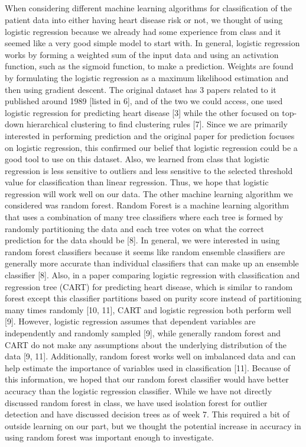 \documentclass[12pt]{article}
\begin{document}
\subsection*{}
When considering different machine learning algorithms for classification of the patient data into either having heart disease risk or not, we thought of using logistic regression because we already had some experience from class and it seemed like a very good simple model to start with. In general, logistic regression works by forming a weighted sum of the input data and using an activation function, such as the sigmoid function, to make a prediction. Weights are found by formulating the logistic regression as a maximum likelihood estimation and then using gradient descent. The original dataset has 3 papers related to it published around 1989 [listed in 6], and of the two we could access, one used logistic regression for predicting heart disease [3] while the other focused on top-down hierarchical clustering to find clustering rules [7]. Since we are primarily interested in performing prediction and the original paper for prediction focuses on logistic regression, this confirmed our belief that logistic regression could be a good tool to use on this dataset. Also, we learned from class that logistic regression is less sensitive to outliers and less sensitive to the selected threshold value for classification than linear regression. Thus, we hope that logistic regression will work well on our data. 
	The other machine learning algorithm we considered was random forest. Random Forest is a machine learning algorithm that uses a combination of many tree classifiers where each tree is formed by randomly partitioning the data and each tree votes on what the correct prediction for the data should be [8]. In general, we were interested in using random forest classifiers because it seems like random ensemble classifiers are generally more accurate than individual classifiers that can make up an ensemble classifier [8]. Also, in a paper comparing logistic regression with classification and regression tree (CART) for predicting heart disease, which is similar to random forest except this classifier partitions based on purity score instead of partitioning many times randomly [10, 11], CART and logistic regression both perform well [9]. However, logistic regression assumes that dependent variables are independently and randomly sampled [9], while generally random forest and CART do not make any assumptions about the underlying distribution of the data [9, 11]. Additionally, random forest works well on imbalanced data and can help estimate the importance of variables used in classification [11]. Because of this information, we hoped that our random forest classifier would have better accuracy than the logistic regression classifier. While we have not directly discussed random forest in class, we have used isolation forest for outlier detection and have discussed decision trees as of week 7. This required a bit of outside learning on our part, but we thought the potential increase in accuracy in using random forest was important enough to investigate.
\end{document}
